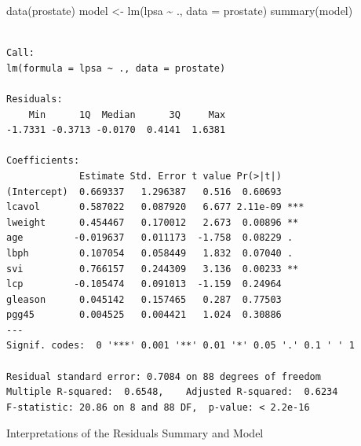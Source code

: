 \documentclass[
  letterpaper,
  DIV=11,
  numbers=noendperiod]{scrartcl}
\newenvironment{Shaded}{\begin{snugshade}}{\end{snugshade}}
\newcommand{\AttributeTok}[1]{\textcolor[rgb]{0.40,0.45,0.13}{#1}}
\newcommand{\FunctionTok}[1]{\textcolor[rgb]{0.28,0.35,0.67}{#1}}
\newcommand{\NormalTok}[1]{\textcolor[rgb]{0.00,0.23,0.31}{#1}}
\newcommand{\OtherTok}[1]{\textcolor[rgb]{0.00,0.23,0.31}{#1}}
\newcommand{\SpecialCharTok}[1]{\textcolor[rgb]{0.37,0.37,0.37}{#1}}
\begin{document}
\begin{Shaded}
\begin{Highlighting}[]
\FunctionTok{data}\NormalTok{(prostate)}
\NormalTok{model }\OtherTok{\textless{}{-}} \FunctionTok{lm}\NormalTok{(lpsa }\SpecialCharTok{\textasciitilde{}}\NormalTok{ ., }\AttributeTok{data =}\NormalTok{ prostate)}
\FunctionTok{summary}\NormalTok{(model)}
\end{Highlighting}
\end{Shaded}

\begin{verbatim}

Call:
lm(formula = lpsa ~ ., data = prostate)

Residuals:
    Min      1Q  Median      3Q     Max 
-1.7331 -0.3713 -0.0170  0.4141  1.6381 

Coefficients:
             Estimate Std. Error t value Pr(>|t|)    
(Intercept)  0.669337   1.296387   0.516  0.60693    
lcavol       0.587022   0.087920   6.677 2.11e-09 ***
lweight      0.454467   0.170012   2.673  0.00896 ** 
age         -0.019637   0.011173  -1.758  0.08229 .  
lbph         0.107054   0.058449   1.832  0.07040 .  
svi          0.766157   0.244309   3.136  0.00233 ** 
lcp         -0.105474   0.091013  -1.159  0.24964    
gleason      0.045142   0.157465   0.287  0.77503    
pgg45        0.004525   0.004421   1.024  0.30886    
---
Signif. codes:  0 '***' 0.001 '**' 0.01 '*' 0.05 '.' 0.1 ' ' 1

Residual standard error: 0.7084 on 88 degrees of freedom
Multiple R-squared:  0.6548,    Adjusted R-squared:  0.6234 
F-statistic: 20.86 on 8 and 88 DF,  p-value: < 2.2e-16
\end{verbatim}

Interpretations of the Residuals Summary and Model
\end{document}
